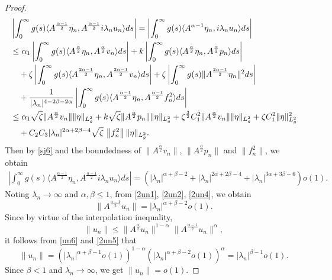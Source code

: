 \documentclass[10pt,a4paper]{amsart}
\begin{document}
\begin{proof}
\begin{align*}
			&\left| \int_0^\infty g(s) \langle
			A^{\frac{\alpha-1}{2}} \eta_n, A^{\frac{\alpha-1}{2}}
			i\lambda_n u_n \rangle ds \right|
			= \left| \int_0^\infty g(s) \langle A^{\alpha-1} \eta_n,
			i\lambda_n u_n \rangle ds \right| \nonumber \\
			&\leq \alpha_1 \left| \int_0^\infty g(s) \langle
			A^{\frac{\alpha}{2}} \eta_n, A^{\frac{\alpha}{2}} v_n
			\rangle ds \right|
			+ k \left| \int_0^\infty g(s) \langle
			A^{\frac{\alpha}{2}} \eta_n, A^{\frac{\alpha}{2}} p_n
			\rangle ds \right|  \\
			&\quad + \zeta \left| \int_0^\infty g(s) \langle
			A^{\frac{2\alpha-1}{2}} \eta_n, A^{\frac{2\alpha-1}{2}} v_n
			\rangle ds \right|
			+ \zeta \left| \int_0^\infty g(s) \|
			A^{\frac{2\alpha-1}{2}} \eta_n \|^2 ds \right|  \\
			&\quad + \frac{1}{|\lambda_n|^{4-2\beta-2\alpha}} \left|
			\int_0^\infty g(s) \langle A^{\frac{\alpha-1}{2}}
			\eta_n, A^{\frac{\alpha-1}{2}} f_n^2 \rangle ds \right|\\
&  \leq \alpha_1 \sqrt{\zeta}\| A^{\frac{\alpha}{2}} v_n \|  \|\eta\|_{L^2_g}
			+ k \sqrt{\zeta}\| A^{\frac{\alpha}{2}} p_n \| \|\eta\|_{L^2_g} + \zeta^{\frac{3}{2}} C_1^2 \| A^{\frac{\alpha}{2}} v_n \| \|\eta\|_{L^2_g}
			+ \zeta C_1^2\|\eta\|_{L^2_g}^2\notag \\
			& \quad + C_2C_3 |\lambda_n|^{2\alpha +2\beta -4} \sqrt{\zeta} \, \left\| f_n^2 \right\|\|\eta\|_{L^2_g}.
		\end{align*}
	Then by \eqref{sj6} and the boundedness of $\| A^{\frac{\alpha}{2}} v_n \|$, $\| A^{\frac{\alpha}{2}} p_n \|$ and $\|f_n^2\|$, we obtain
		\begin{align}\label{2un4}
	\left| \int_0^\infty g(s) \langle A^{\frac{\alpha-1}{2}} \eta_n, A^{\frac{\alpha-1}{2}} i\lambda_n u_n \rangle ds \right|=\left(|\lambda_n|^{\alpha +\beta -2}+|\lambda_n|^{2\alpha +2\beta -4}+|\lambda_n|^{3\alpha +3\beta -6}\right)o(1).
		\end{align}
Noting $\lambda_n\to\infty$ and $\alpha,\beta\le1$, 	from \eqref{2un1}, \eqref{2un2}, \eqref{2un4}, we obtain
		\begin{equation}\label{2un5}
			\|A^{\frac{\alpha-1}{2}}u_n\|=|\lambda_n|^{\alpha +\beta -2}o(1).
		\end{equation}
Since by virtue of the interpolation inequality,
\[\|u_n\| \le\|A^{\frac{\alpha}{2}}u_n\|^{1-\alpha}\|A^{\frac{\alpha-1}{2}}u_n\|^{\alpha},\]
it follows from \eqref{un6} and \eqref{2un5} that
\[\|u_n\|=\left(|\lambda_n|^{\alpha + \beta - 1} o(1)\right)^{1-\alpha}\left(|\lambda_n|^{\alpha +\beta -2}o(1)\right)^{\alpha}=|\lambda_n|^{\beta-1}o(1).\]
Since $\beta<1$ and $\lambda_n\to\infty$, we get $	\| u_n \|=o(1)$.


\end{proof}
\end{document}
